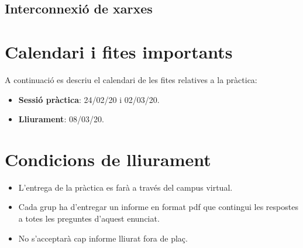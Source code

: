 \documentclass[12pt,a4paper]{article}
\begin{document}
\subsection{Interconnexió de xarxes}





\section{Calendari i fites importants}

A continuació es descriu el calendari de les fites relatives a la pràctica:

\begin{itemize}
        \item \textbf{Sessió pràctica}: 24/02/20 i 02/03/20.
	\item \textbf{Lliurament}: 08/03/20.
\end{itemize}

\section{Condicions de lliurament}

\begin{itemize}
  \item L'entrega de la pràctica es farà a través del campus virtual.
  \item Cada grup ha d'entregar un informe en format pdf que contingui les respostes a totes les preguntes d'aquest enunciat.
   \item No s'acceptarà cap informe lliurat fora de plaç.
\end{itemize}



\end{document}
